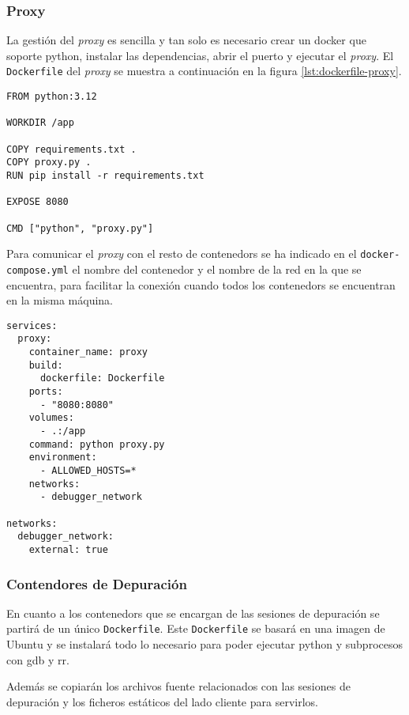 \subsubsection{Proxy}

La gestión del \textit{\gls{proxy}} es sencilla y tan solo es necesario crear un docker que soporte python, instalar las dependencias, abrir el puerto y ejecutar el \textit{\gls{proxy}}. El \texttt{Dockerfile} del \textit{\gls{proxy}} se muestra a continuación en la figura \ref{lst:dockerfile-proxy}. 

\begin{lstlisting}[caption={Dockerfile para el proxy}, label={lst:dockerfile-proxy}]
FROM python:3.12

WORKDIR /app

COPY requirements.txt .
COPY proxy.py .
RUN pip install -r requirements.txt

EXPOSE 8080

CMD ["python", "proxy.py"]
\end{lstlisting}

Para comunicar el \textit{\gls{proxy}} con el resto de \glspl{contenedor} se ha indicado en el \texttt{docker-compose.yml} el nombre del \gls{contenedor} y el nombre de la red en la que se encuentra, para facilitar la conexión cuando todos los \glspl{contenedor} se encuentran en la misma máquina.

\begin{lstlisting}[caption={Docker-compose.yml para el contenedor del proxy}, label={lst:docker-compose-proxy}]
    services:
  proxy:
    container_name: proxy  
    build:
      dockerfile: Dockerfile
    ports:
      - "8080:8080" 
    volumes:
      - .:/app
    command: python proxy.py
    environment:
      - ALLOWED_HOSTS=*
    networks:
      - debugger_network

networks:
  debugger_network:
    external: true 
\end{lstlisting}

\subsubsection{Contendores de Depuración}

En cuanto a los \glspl{contenedor} que se encargan de las sesiones de depuración se partirá de un único \texttt{Dockerfile}. Este \texttt{Dockerfile} se basará en una imagen de Ubuntu y se instalará todo lo necesario para poder ejecutar python y subprocesos con gdb y rr.

Además se copiarán los archivos fuente relacionados con las sesiones de depuración y los ficheros estáticos del lado cliente para servirlos.


